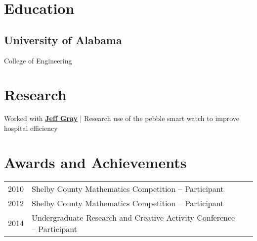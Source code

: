 \documentclass[letterpaper]{deedy-resume} %
\begin{document}
\begin{minipage}[t]{0.64\textwidth} %





\section{Education} 

\subsection{University of Alabama}


College of Engineering \\

\sectionspace %


\section{Research}


Worked with \textbf{\href{http://gray.cs.ua.edu}{Jeff Gray}} | Research use of the pebble smart watch to improve hospital efficiency 

\sectionspace %


 \section{Awards and Achievements} 
 \begin{tabular}{rll}
2010	 & Shelby County Mathematics Competition -- Participant \\
2012	 & Shelby County Mathematics Competition -- Participant \\
2014	 &Undergraduate Research and Creative Activity Conference -- Participant \\


\end{tabular}
\end{minipage}
\end{document}

